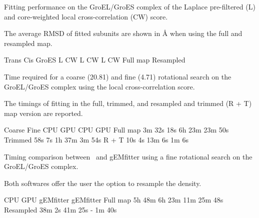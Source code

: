 \caption{Fitting performance on the GroEL/GroES complex of the Laplace
pre-filtered (L) and core-weighted local cross-correlation (CW) score.}
{The average RMSD of fitted subunits are shown in Å when using the full
and resampled map.}
\stopbuffer

\bTABLE
\setupTABLE[r][1,2][style=table:head, background=color, 
    backgroundcolor=tableheadcolor]
\setupTABLE[c][1][width=8em]
\bTABLEhead
\bTR \bTD[nr=2] \eTD \bTD[nc=2] Trans \eTD \bTD[nc=2] Cis \eTD \bTD[nc=2] GroES \eTD \eTR
\bTR \bTD L \eTD \bTD CW \eTD \bTD L \eTD \bTD CW \eTD \bTD L \eTD \bTD CW \eTD \eTR
\eTABLEhead
\bTABLEbody
\bTR \bTD Full map \eTD {} \eTD {} \eTD {} \eTD {} \eTD {} \eTD {} \eTD \eTR
\bTR \bTD Resampled \eTD {} \eTD {} \eTD {} \eTD {} \eTD {} \eTD {} \eTD \eTR
\eTABLEbody
\eTABLE
\stopbuffer


\caption{Time required for a coarse (20.81\Deg) and fine (4.71\Deg) rotational
search on the GroEL/GroES complex using the local cross-correlation score.}
{The timings of fitting in the full, trimmed, and resampled and trimmed (R + T)
map version are reported.}
\stopbuffer

\bTABLE
\setupTABLE[r][1,2][style=table:head, background=color, 
    backgroundcolor=tableheadcolor]
\bTABLEhead
\bTR \bTD[nr=2]  \eTD \bTD[nc=2] Coarse \eTD \bTD[nc=2] Fine \eTD \eTR
\bTR \bTD CPU \eTD \bTD GPU \eTD \bTD CPU \eTD \bTD  GPU \eTD \eTR
\eTABLEhead
\bTABLEbody
\bTR \bTD Full map \eTD \bTD 3m 32s  \eTD \bTD 18s \eTD \bTD 6h 23m  \eTD \bTD 23m 50s \eTD \eTR
\bTR \bTD Trimmed  \eTD \bTD 58s     \eTD \bTD 7s  \eTD \bTD 1h 37m  \eTD \bTD 3m 54s  \eTD \eTR
\bTR \bTD R + T    \eTD \bTD 10s     \eTD \bTD 4s  \eTD \bTD 13m 6s  \eTD \bTD 1m 6s   \eTD \eTR
\eTABLEbody
\eTABLE
\stopbuffer


\caption{Timing comparison between \powerfit\ and gEMfitter using a fine
rotational search on the GroEL/GroES complex.}
{Both softwares offer the user the option to resample the density.}
\stopbuffer

\bTABLE
\setupTABLE[r][1,2][style=table:head, background=color, 
    backgroundcolor=tableheadcolor]
\bTR \bTD[nr=2] \eTD \bTD[nc=2] CPU \eTD \bTD[nc=2] GPU \eTD \eTR
\bTR \bTD gEMfitter \eTD \bTD \powerfit \eTD \bTD gEMfitter \eTD \bTD \powerfit \eTD \eTR
\bTR \bTD Full map \eTD \bTD 5h 48m \eTD \bTD 6h 23m \eTD \bTD 11m \eTD \bTD 25m 48s \eTD \eTR
\bTR \bTD Resampled \eTD \bTD 38m 2s \eTD \bTD 41m 25s \eTD \bTD - \eTD \bTD 1m 40s \eTD \eTR
\eTABLE
\stopbuffer


